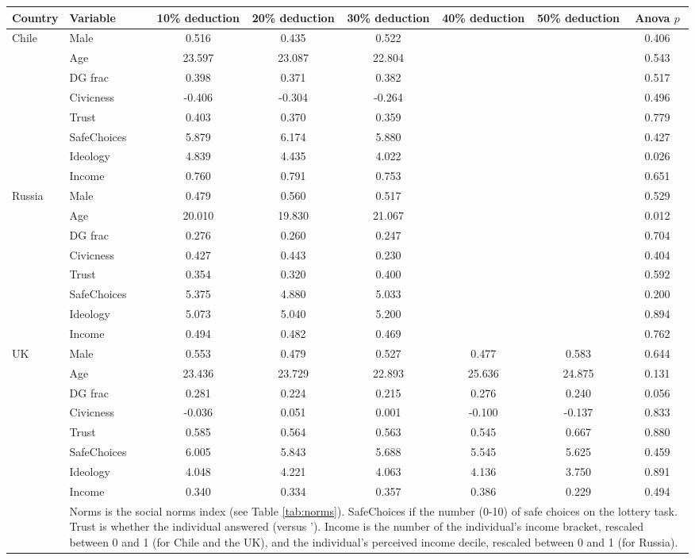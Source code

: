\begin{tabular}{llcccccc}
\hline
\hline
Country&Variable&10\% deduction&20\% deduction&30\% deduction&40\% deduction&50\% deduction&Anova $ p$\\
\hline
Chile&Male&0.516&0.435&0.522&&&0.406\\
&Age&23.597&23.087&22.804&&&0.543\\
&DG frac&0.398&0.371&0.382&&&0.517\\
&Civicness&-0.406&-0.304&-0.264&&&0.496\\
&Trust&0.403&0.370&0.359&&&0.779\\
&SafeChoices&5.879&6.174&5.880&&&0.427\\
&Ideology&4.839&4.435&4.022&&&0.026\\
&Income&0.760&0.791&0.753&&&0.651\\
\hline
Russia&Male&0.479&0.560&0.517&&&0.529\\
&Age&20.010&19.830&21.067&&&0.012\\
&DG frac&0.276&0.260&0.247&&&0.704\\
&Civicness&0.427&0.443&0.230&&&0.404\\
&Trust&0.354&0.320&0.400&&&0.592\\
&SafeChoices&5.375&4.880&5.033&&&0.200\\
&Ideology&5.073&5.040&5.200&&&0.894\\
&Income&0.494&0.482&0.469&&&0.762\\
\hline
UK&Male&0.553&0.479&0.527&0.477&0.583&0.644\\
&Age&23.436&23.729&22.893&25.636&24.875&0.131\\
&DG frac&0.281&0.224&0.215&0.276&0.240&0.056\\
&Civicness&-0.036&0.051&0.001&-0.100&-0.137&0.833\\
&Trust&0.585&0.564&0.563&0.545&0.667&0.880\\
&SafeChoices&6.005&5.843&5.688&5.545&5.625&0.459\\
&Ideology&4.048&4.221&4.063&4.136&3.750&0.891\\
&Income&0.340&0.334&0.357&0.386&0.229&0.494\\
\hline
\hline
&\multicolumn{7}{p{16cm}}{\footnotesize Norms is the social norms index (see Table \ref{tab:norms}). SafeChoices if the number (0-10) of safe choices on the lottery task. Trust is whether the individual answered  (versus '). Income is the number of the individual's income bracket, rescaled between 0 and 1 (for Chile and the UK), and the individual's perceived income decile, rescaled between 0 and 1 (for Russia).}\\
\end{tabular}